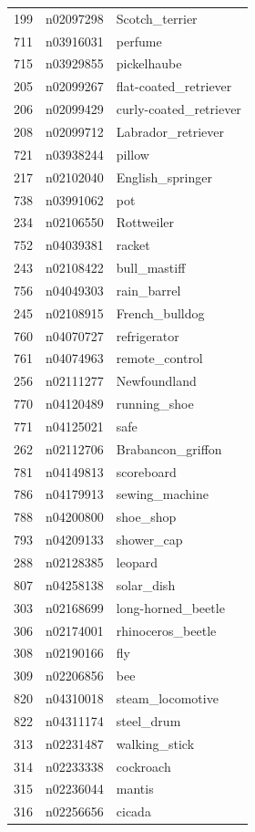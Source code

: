 \begin{table}
\begin{tabular}{cll}
199 & n02097298 & Scotch_terrier \\
711 & n03916031 & perfume \\
715 & n03929855 & pickelhaube \\
205 & n02099267 & flat-coated_retriever \\
206 & n02099429 & curly-coated_retriever \\
208 & n02099712 & Labrador_retriever \\
721 & n03938244 & pillow \\
217 & n02102040 & English_springer \\
738 & n03991062 & pot \\
234 & n02106550 & Rottweiler \\
752 & n04039381 & racket \\
243 & n02108422 & bull_mastiff \\
756 & n04049303 & rain_barrel \\
245 & n02108915 & French_bulldog \\
760 & n04070727 & refrigerator \\
761 & n04074963 & remote_control \\
256 & n02111277 & Newfoundland \\
770 & n04120489 & running_shoe \\
771 & n04125021 & safe \\
262 & n02112706 & Brabancon_griffon \\
781 & n04149813 & scoreboard \\
786 & n04179913 & sewing_machine \\
788 & n04200800 & shoe_shop \\
793 & n04209133 & shower_cap \\
288 & n02128385 & leopard \\
807 & n04258138 & solar_dish \\
303 & n02168699 & long-horned_beetle \\
306 & n02174001 & rhinoceros_beetle \\
308 & n02190166 & fly \\
309 & n02206856 & bee \\
820 & n04310018 & steam_locomotive \\
822 & n04311174 & steel_drum \\
313 & n02231487 & walking_stick \\
314 & n02233338 & cockroach \\
315 & n02236044 & mantis \\
316 & n02256656 & cicada \\

\end{tabular}
\end{table}
